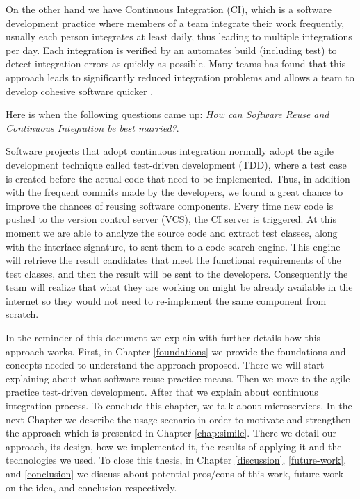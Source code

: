 On the other hand we have Continuous Integration (CI), which is a software development practice where members of a team integrate their work frequently, usually each person integrates at least daily, thus leading to multiple integrations per day. Each integration is verified by an automates build (including test) to detect integration errors as quickly as possible. Many teams has found that this approach leads to significantly reduced integration problems and allows a team to develop cohesive software quicker \cite{Fowler2006}.

Here is when the following questions came up: \emph{How can Software Reuse and Continuous Integration be best married?}.

Software projects that adopt continuous integration normally adopt the agile development technique called test-driven development (TDD), where a test case is created before the actual code that need to be implemented. Thus, in addition with the frequent commits made by the developers, we found a great chance to improve the chances of reusing software components. Every time new code is pushed to the version control server (VCS), the CI server is triggered. At this moment we are able to analyze the source code and extract test classes, along with the interface signature, to sent them to a code-search engine. This engine will retrieve the result candidates that meet the functional requirements of the test classes, and then the result will be sent to the developers. Consequently the team will realize that what they are working on might be already available in the internet so they would not need to re-implement the same component from scratch.

In the reminder of this document we explain with further details how this approach works. First, in Chapter \ref{foundations} we provide the foundations and concepts needed to understand the approach proposed. There we will start explaining about what software reuse practice means. Then we move to the agile practice test-driven development. After that we explain about continuous integration process. To conclude this chapter, we talk about microservices. In the next Chapter we describe the usage scenario in order to motivate and strengthen the approach which is presented in Chapter \ref{chap:simile}. There we detail our approach, its design, how we implemented it, the results of applying it and the technologies we used. To close this thesis, in Chapter \ref{discussion}, \ref{future-work}, and \ref{conclusion} we discuss about potential pros/cons of this work, future work on the idea, and conclusion respectively.




